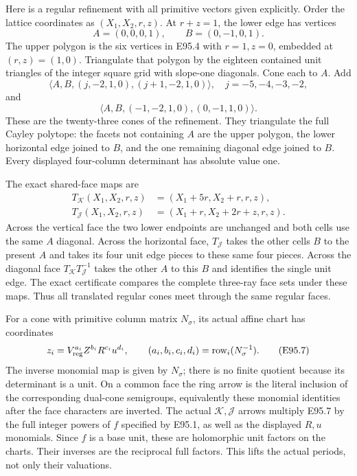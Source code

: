 Here is a regular refinement with all primitive
vectors given explicitly. Order the lattice coordinates
as \((X_1,X_2,r,z)\). At \(r+z=1\), the lower edge
has vertices
\[
 A=(0,0,0,1),\qquad B=(0,-1,0,1).
\]
The upper polygon is the six vertices in E95.4
with \(r=1,z=0\), embedded at \((r,z)=(1,0)\).
Triangulate that polygon by the eighteen contained
unit triangles of the integer square grid with
slope-one diagonals. Cone each to \(A\). Add
\[
 \langle A,B,(j,-2,1,0),(j+1,-2,1,0)\rangle,
       \quad j=-5,-4,-3,-2,
\]
and
\[
 \langle A,B,(-1,-2,1,0),(0,-1,1,0)\rangle.       \tag{E95.5}
\]
These are the twenty-three cones of the refinement.
They triangulate the full Cayley polytope: the
facets not containing \(A\) are the upper polygon,
the lower horizontal edge joined to \(B\), and
the one remaining diagonal edge joined to \(B\).
Every displayed four-column determinant has absolute
value one.

The exact shared-face maps are
\[
\begin{aligned}
 T_{\mathcal K}(X_1,X_2,r,z)
   &=(X_1+5r,X_2+r,r,z),\\
 T_{\mathcal J}(X_1,X_2,r,z)
   &=(X_1+r,X_2+2r+z,r,z).
\end{aligned}                                                   \tag{E95.6}
\]
Across the vertical face the two lower endpoints
are unchanged and both cells use the same \(A\)
diagonal. Across the horizontal face,
\(T_{\mathcal J}\) takes the other cell\textquotesingle s \(B\)
to the present \(A\) and takes its four unit edge
pieces to these same four pieces. Across the
diagonal face \(T_{\mathcal K}T_{\mathcal J}^{-1}\)
takes the other \(A\) to this \(B\) and identifies
the single unit edge. The exact certificate compares
the complete three-ray face sets under these maps.
Thus all translated regular cones meet through the
same regular faces.

For a cone with primitive column matrix \(N_\sigma\),
its actual affine chart has coordinates
\[
 z_i=V_{\rm reg}^{a_i}Z^{b_i}R^{c_i}u^{d_i},
 \qquad
 (a_i,b_i,c_i,d_i)=\text{row}_i(N_\sigma^{-1}).
 \tag{E95.7}
\]
The inverse monomial map is given by \(N_\sigma\);
there is no finite quotient because its determinant
is a unit. On a common face the ring arrow is the
literal inclusion of the corresponding dual-cone
semigroups, equivalently these monomial identities
after the face characters are inverted. The actual
\(\mathcal K,\mathcal J\) arrows multiply E95.7
by the full integer powers of \(f\) specified by
E95.1, as well as the displayed \(R,u\) monomials.
Since \(f\) is a base unit, these are holomorphic
unit factors on the charts. Their inverses are the
reciprocal full factors. This lifts the actual
periods, not only their valuations.


